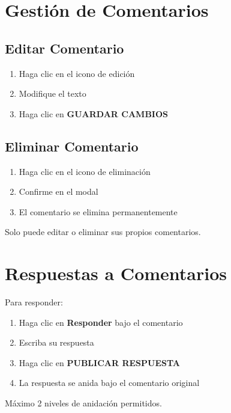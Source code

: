 \documentclass[11pt,a4paper,twoside]{book}
\begin{document}
\section{Gestión de Comentarios}

\subsection{Editar Comentario}
\begin{enumerate}
    \item Haga clic en el icono de edición
    \item Modifique el texto
    \item Haga clic en \textbf{GUARDAR CAMBIOS}
\end{enumerate}

\subsection{Eliminar Comentario}
\begin{enumerate}
    \item Haga clic en el icono de eliminación
    \item Confirme en el modal
    \item El comentario se elimina permanentemente
\end{enumerate}

\begin{warningbox}
Solo puede editar o eliminar sus propios comentarios.
\end{warningbox}

\section{Respuestas a Comentarios}

Para responder:
\begin{enumerate}
    \item Haga clic en \textbf{Responder} bajo el comentario
    \item Escriba su respuesta
    \item Haga clic en \textbf{PUBLICAR RESPUESTA}
    \item La respuesta se anida bajo el comentario original
\end{enumerate}

Máximo 2 niveles de anidación permitidos.

\end{document}
